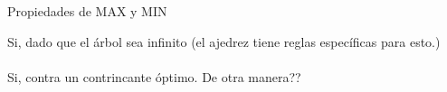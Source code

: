 \begin{frame}{Propiedades de MAX y MIN}
    
     Si, dado que el \'arbol sea infinito (el ajedrez tiene reglas espec\'ificas para esto.)\\~\\
    
     Si, contra un contrincante \'optimo. De otra manera??\\~\\
    
    
\end{frame}
